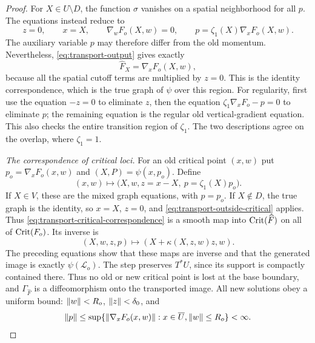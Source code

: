 \begin{proof}
For $X\in U\setminus D$, the function $\sigma$ vanishes on a spatial
neighborhood for all $p$.  The equations instead reduce to
\begin{equation}
 z=0,\qquad x=X,\qquad
 \nabla_wF_o(X,w)=0,\qquad
 p=\zeta_1(X)\nabla_xF_o(X,w).
 \label{eq:transport-outside-critical}
\end{equation}
The auxiliary variable $p$ may therefore differ from the old
momentum.  Nevertheless, \eqref{eq:transport-output} gives exactly
\begin{equation}
 \widehat F_X=\nabla_xF_o(X,w),
 \label{eq:transport-outside-output}
\end{equation}
because all the spatial cutoff terms are multiplied by $z=0$.
This is the identity correspondence, which is the true graph of
$\psi$ over this region.  For regularity, first use the equation
$-z=0$ to eliminate $z$, then the equation
$\zeta_1\nabla_xF_o-p=0$ to eliminate $p$; the remaining equation
is the regular old vertical-gradient equation.  This also checks
the entire transition region of $\zeta_1$.  The two descriptions
agree on the overlap, where $\zeta_1=1$.

\emph{The correspondence of critical loci.}
For an old critical point $(x,w)$ put
$p_o=\nabla_xF_o(x,w)$ and $(X,P)=\psi(x,p_o)$.  Define
\begin{equation}
 (x,w)\longmapsto
 \bigl(X,w,z=x-X,\ p=\zeta_1(X)p_o\bigr).
 \label{eq:transport-critical-correspondence}
\end{equation}
If $X\in V$, these are the mixed graph equations, with $p=p_o$.
If $X\notin D$, the true graph is the identity, so $x=X$, $z=0$,
and \eqref{eq:transport-outside-critical} applies.  Thus
\eqref{eq:transport-critical-correspondence} is a smooth map into
$\operatorname{Crit}(\widehat F)$ on all of $\operatorname{Crit}(F_o)$.  Its inverse is
\begin{equation}
 (X,w,z,p)\longmapsto(X+\kappa(X,z,w)z,w).
 \label{eq:transport-critical-inverse}
\end{equation}
The preceding equations show that these maps are inverse and that
the generated image is exactly $\psi(\mathcal L_o)$.
The step preserves $T^*U$, since its support is compactly contained
there.  Thus no old or new critical point is lost at the base
boundary, and $\Gamma_{\widehat F}$ is a diffeomorphism onto the transported
image.  All new solutions obey a uniform bound: $\lVert w\rVert<R_o$,
$\lVert z\rVert<\delta_0$, and
\[
 \lVert p\rVert\le
 \sup\{ \lVert\nabla_xF_o(x,w)\rVert:x\in\overline U, \lVert w\rVert\le R_o\}<\infty.
\]


\end{proof}
